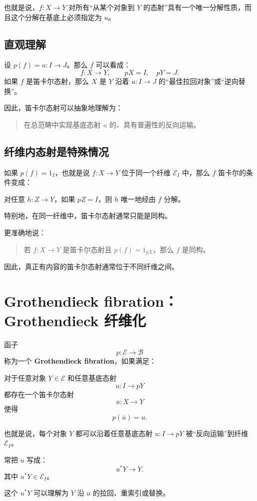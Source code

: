 \documentclass[12pt,a4paper]{article}
\begin{document}
也就是说，\(f:X\to Y\) 对所有“从某个对象到 \(Y\) 的态射”具有一个唯一分解性质，而且这个分解在基底上必须指定为 \(u\)。

\subsection{直观理解}

设 \(p(f)=u:I\to J\)。那么 \(f\) 可以看成：
\[
f:X\to Y,
\qquad
pX=I,\quad pY=J.
\]
如果 \(f\) 是笛卡尔态射，那么 \(X\) 是 \(Y\) 沿着 \(u:I\to J\) 的“最佳拉回对象”或“逆向替换”。

因此，笛卡尔态射可以抽象地理解为：
\begin{quote}
在总范畴中实现基底态射 \(u\) 的、具有普遍性的反向运输。
\end{quote}

\subsection{纤维内态射是特殊情况}

如果 \(p(f)=1_I\)，也就是说 \(f:X\to Y\) 位于同一个纤维 \(\mathcal{E}_I\) 中，那么 \(f\) 笛卡尔的条件变成：

对任意 \(h:Z\to Y\)，如果 \(pZ=I\)，则 \(h\) 唯一地经由 \(f\) 分解。

特别地，在同一纤维中，笛卡尔态射通常只能是同构。

更准确地说：
\begin{quote}
若 \(f:X\to Y\) 是笛卡尔态射且 \(p(f)=1_{pX}\)，那么 \(f\) 是同构。
\end{quote}

因此，真正有内容的笛卡尔态射通常位于不同纤维之间。

\section{Grothendieck fibration：Grothendieck 纤维化}

函子
\[
p:\mathcal{E}\to\mathcal{B}
\]
称为一个 \textbf{Grothendieck fibration}，如果满足：

对于任意对象 \(Y\in\mathcal{E}\) 和任意基底态射
\[
u:I\to pY
\]
都存在一个笛卡尔态射
\[
\overline{u}:X\to Y
\]
使得
\[
p(\overline{u})=u.
\]

也就是说，每个对象 \(Y\) 都可以沿着任意基底态射 \(u:I\to pY\) 被“反向运输”到纤维 \(\mathcal{E}_I\)。

常把 \(\overline{u}\) 写成：
\[
u^*Y\longrightarrow Y.
\]
其中 \(u^*Y\in\mathcal{E}_I\)。

这个 \(u^*Y\) 可以理解为 \(Y\) 沿 \(u\) 的拉回、重索引或替换。
\end{document}
